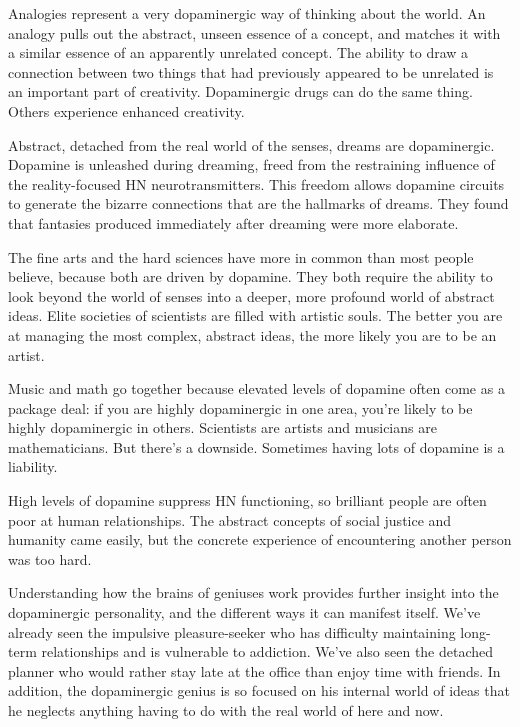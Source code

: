 \documentclass[ebook,12pt,oneside,openany]{memoir}
\begin{document}
Analogies represent a very dopaminergic way of thinking about the world.
An analogy pulls out the abstract, unseen essence of a concept, and matches it with a similar essence of an apparently unrelated concept.
The ability to draw a connection between two things that had previously appeared to be unrelated is an important part of creativity.
Dopaminergic drugs can do the same thing. Others experience enhanced creativity.  

Abstract, detached from the real world of the senses, dreams are dopaminergic.
Dopamine is unleashed during dreaming, freed from the restraining influence of the reality-focused HN neurotransmitters. 
This freedom allows dopamine circuits to generate the bizarre connections that are the hallmarks of dreams.
They found that fantasies produced immediately after dreaming were more elaborate.


The fine arts and the hard sciences have more in common than most people believe, 
because both are driven by dopamine. 
They both require the ability to look beyond the world of senses into a deeper, more profound 
world of abstract ideas. 
Elite societies of scientists are filled with artistic souls.
The better you are at managing the most complex, abstract ideas,
the more likely you are to be an artist.

Music and math go together because elevated levels of dopamine often come as a package deal:
if you are highly dopaminergic in one area, 
you're likely to be highly dopaminergic in others.
Scientists are artists and musicians are mathematicians. 
But there's a downside. Sometimes having lots of dopamine is a liability.

High levels of dopamine suppress HN functioning, so brilliant people are often 
poor at human relationships. 
The abstract concepts of social justice and humanity came easily, but the concrete 
experience of encountering another person was too hard.

Understanding how the brains of geniuses work provides further insight into the dopaminergic 
personality, and the different ways it can manifest itself.
We've already seen the impulsive pleasure-seeker who has difficulty maintaining long-term relationships and 
is vulnerable to addiction. 
We've also seen the detached planner who would rather stay late at the office than enjoy time with friends.
In addition, the dopaminergic genius is so focused on his internal world of ideas that he neglects anything 
having to do with the real world of here and now.
\end{document}
